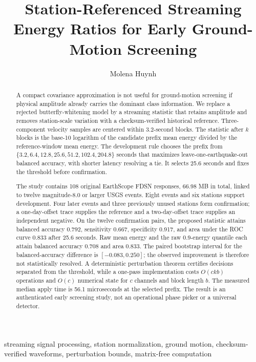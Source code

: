 \documentclass[10pt,letterpaper,twoside]{article}
\title{Station-Referenced Streaming Energy Ratios for Early
Ground-Motion Screening}
\author{Molena Huynh}
\affiliation{North Carolina State University}
\date{}
\begin{document}
\setlength{\emergencystretch}{2em}
\maketitle

\begin{abstract}
A compact covariance approximation is not useful for ground-motion screening
if physical amplitude already carries the dominant class information.  We
replace a rejected butterfly-whitening model by a streaming statistic that
retains amplitude and removes station-scale variation with a checksum-verified
historical reference.  Three-component velocity samples are centered within
3.2-second blocks.  The statistic after $k$ blocks is the base-10 logarithm
of the candidate prefix mean energy divided by the reference-window mean
energy.  The development rule chooses the prefix from
$\{3.2,6.4,12.8,25.6,51.2,102.4,204.8\}$ seconds that maximizes
leave-one-earthquake-out balanced accuracy, with shorter latency resolving a
tie.  It selects 25.6 seconds and fixes the threshold before confirmation.

The study contains 108 original EarthScope FDSN responses, 66.98 MB in total,
linked to twelve magnitude-8.0 or larger USGS events.  Eight events and six
stations support development.  Four later events and three previously unused
stations form confirmation; a one-day-offset trace supplies the reference and
a two-day-offset trace supplies an independent negative.  On the twelve
confirmation pairs, the proposed statistic attains balanced accuracy 0.792,
sensitivity 0.667, specificity 0.917, and area under the ROC curve 0.833 after
25.6 seconds.  Raw mean energy and the raw 0.9-energy quantile each attain
balanced accuracy 0.708 and area 0.833.  The paired bootstrap interval for the
balanced-accuracy difference is $[-0.083,0.250]$; the observed improvement is
therefore not statistically resolved.  A deterministic perturbation theorem
certifies decisions separated from the threshold, while a one-pass
implementation costs $O(ckb)$ operations and $O(c)$ numerical state for $c$
channels and block length $b$.  The measured median apply time is 56.1
microseconds at the selected prefix.  The result is an authenticated early
screening study, not an operational phase picker or a universal detector.
\end{abstract}

\begin{keywords}
streaming signal processing, station normalization, ground motion,
checksum-verified waveforms, perturbation bounds, matrix-free computation
\end{keywords}
\end{document}
